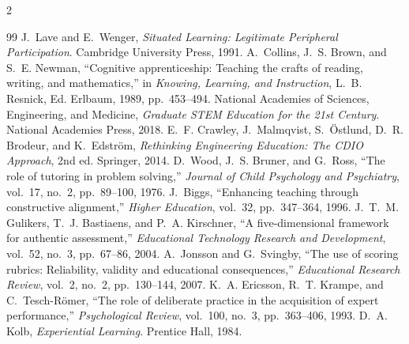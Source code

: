 \documentclass[10pt,letterpaper]{article}
\begin{document}
\begin{multicols}{2}\scriptsize
\begin{thebibliography}{99}
\setlength{\itemsep}{0pt}\setlength{\parskip}{0pt}
 J.~Lave and E.~Wenger, \textit{Situated Learning: Legitimate Peripheral Participation}. Cambridge University Press, 1991.
 A.~Collins, J.~S. Brown, and S.~E. Newman, ``Cognitive apprenticeship: Teaching the crafts of reading, writing, and mathematics,'' in \textit{Knowing, Learning, and Instruction}, L.~B. Resnick, Ed. Erlbaum, 1989, pp.~453--494.
 National Academies of Sciences, Engineering, and Medicine, \textit{Graduate STEM Education for the 21st Century}. National Academies Press, 2018.
 E.~F. Crawley, J.~Malmqvist, S.~\"{O}stlund, D.~R. Brodeur, and K.~Edstr\"{o}m, \textit{Rethinking Engineering Education: The CDIO Approach}, 2nd ed. Springer, 2014.
 D.~Wood, J.~S. Bruner, and G.~Ross, ``The role of tutoring in problem solving,'' \textit{Journal of Child Psychology and Psychiatry}, vol.~17, no.~2, pp.~89--100, 1976.
 J.~Biggs, ``Enhancing teaching through constructive alignment,'' \textit{Higher Education}, vol.~32, pp.~347--364, 1996.
 J.~T.~M. Gulikers, T.~J. Bastiaens, and P.~A. Kirschner, ``A five-dimensional framework for authentic assessment,'' \textit{Educational Technology Research and Development}, vol.~52, no.~3, pp.~67--86, 2004.
 A.~Jonsson and G.~Svingby, ``The use of scoring rubrics: Reliability, validity and educational consequences,'' \textit{Educational Research Review}, vol.~2, no.~2, pp.~130--144, 2007.
 K.~A. Ericsson, R.~T. Krampe, and C.~Tesch-R\"{o}mer, ``The role of deliberate practice in the acquisition of expert performance,'' \textit{Psychological Review}, vol.~100, no.~3, pp.~363--406, 1993.
 D.~A. Kolb, \textit{Experiential Learning}. Prentice Hall, 1984.
\end{thebibliography}
\end{multicols}
\end{document}
